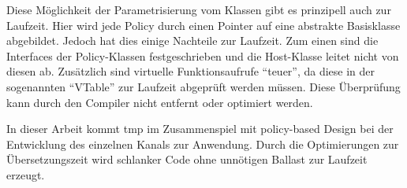 

Diese Möglichkeit der Parametrisierung vom Klassen gibt es prinzipell auch zur Laufzeit. Hier wird jede Policy durch einen Pointer auf eine abstrakte Basisklasse abgebildet. Jedoch hat dies einige Nachteile zur Laufzeit. Zum einen sind die Interfaces der Policy-Klassen festgeschrieben und die Host-Klasse leitet nicht von diesen ab. Zusätzlich sind virtuelle Funktionsaufrufe ``teuer'', da diese in der sogenannten ``VTable'' zur Laufzeit abgeprüft werden müssen. Diese Überprüfung kann durch den Compiler nicht entfernt oder optimiert werden. 


In dieser Arbeit kommt \ac{tmp} im Zusammenspiel mit policy-based Design bei der Entwicklung des einzelnen Kanals zur Anwendung. Durch die Optimierungen zur Übersetzungszeit wird schlanker Code ohne unnötigen Ballast zur Laufzeit erzeugt.
